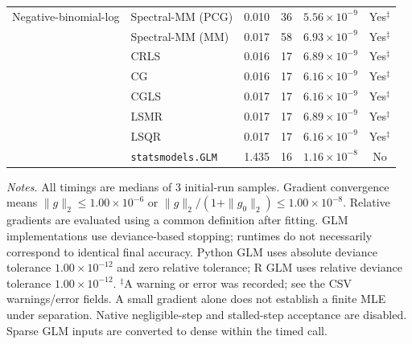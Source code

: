 \begin{longtable}{llrrrc}
\midrule
Negative-binomial-log & Spectral-MM (PCG) & 0.010 & 36 & $5.56\times10^{-9}$ & Yes$^{\ddagger}$ \\
 & Spectral-MM (MM) & 0.017 & 58 & $6.93\times10^{-9}$ & Yes$^{\ddagger}$ \\
 & CRLS & 0.016 & 17 & $6.89\times10^{-9}$ & Yes$^{\ddagger}$ \\
 & CG & 0.016 & 17 & $6.16\times10^{-9}$ & Yes$^{\ddagger}$ \\
 & CGLS & 0.017 & 17 & $6.16\times10^{-9}$ & Yes$^{\ddagger}$ \\
 & LSMR & 0.017 & 17 & $6.89\times10^{-9}$ & Yes$^{\ddagger}$ \\
 & LSQR & 0.017 & 17 & $6.16\times10^{-9}$ & Yes$^{\ddagger}$ \\
 & \texttt{statsmodels.GLM} & 1.435 & 16 & $1.16\times10^{-8}$ & No \\
\end{longtable}
\noindent\textit{Notes.} All timings are medians of 3 initial-run samples.
Gradient convergence means $\|g\|_2\leq 1.00\times10^{-6}$ or $\|g\|_2/(1+\|g_0\|_2)\leq 1.00\times10^{-8}$.
Relative gradients are evaluated using a common definition after fitting. GLM implementations use deviance-based stopping; runtimes do not necessarily correspond to identical final accuracy.
Python GLM uses absolute deviance tolerance $1.00\times10^{-12}$ and zero relative tolerance; R GLM uses relative deviance tolerance $1.00\times10^{-12}$.
$^{\ddagger}$A warning or error was recorded; see the CSV warnings/error fields. A small gradient alone does not establish a finite MLE under separation.
Native negligible-step and stalled-step acceptance are disabled.
Sparse GLM inputs are converted to dense within the timed call.
\par
\endgroup

